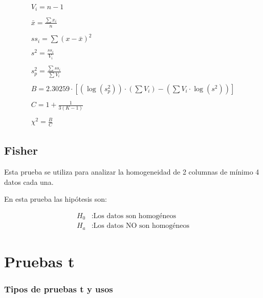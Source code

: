 \documentclass{AsignaturaResumen}
\begin{document}
\begin{gather*}
    V_{i} = n - 1
    \\\\
    \bar{x} = \frac{\sum{x_{i}}}{n}
    \\\\
    ss_{i} = \sum (x- \bar{x})^2
    \\\\
    s^{2} = \frac{ss_{i}}{V_{i}}
    \\\\
    s^{2}_{p} = \frac{\sum{ss_{i}}}{\sum{V_{i}}}
    \\\\
    B = 2.30259 \cdot  \left[ \left(\log(s_{p}^{2})\right) \cdot \left(\sum{V_{i}}\right) - \left(\sum{V_{i} \cdot \log(s^{2})}\right) \right]
    \\\\
    C = 1 + \frac{1}{3(K-1)}
    \\\\
    \chi^{2} = \frac{B}{C}
\end{gather*}

\subsection{Fisher}

Esta prueba se utiliza para analizar la homogeneidad de 2 columnas de mínimo 4 datos cada una.

En esta prueba las hipótesis son:

\begin{align*}
    H_{0} &: \text{Los datos son homogéneos}
    \\
    H_{a} &: \text{Los datos NO son homogéneos}
\end{align*}


\section{Pruebas t}

\subsubsection{Tipos de pruebas t y usos}
\end{document}
